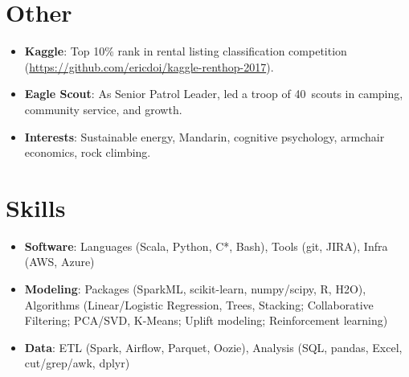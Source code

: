 \documentclass[letterpaper,11pt]{article}
\newcommand{\plus}{\raisebox{.4\height}{\scalebox{.6}{+}}}
\newcommand{\resumeItem}[2]{
  \item\small{
    \textbf{#1}{: #2 \vspace{-2pt}}
  }
}
\newcommand{\resumeSubItem}[2]{\resumeItem{#1}{#2}\vspace{-4pt}}
\newcommand{\resumeSubHeadingListStart}{\begin{itemize}[leftmargin=*]}
\newcommand{\resumeSubHeadingListEnd}{\end{itemize}}
\begin{document}
\section{Other}
  \resumeSubHeadingListStart
    \resumeSubItem{Kaggle}
      {Top 10\% rank in rental listing classification competition (\href{github.com/ericdoi/kaggle-renthop-2017}{https://github.com/ericdoi/kaggle-renthop-2017}).}
    \resumeSubItem{Eagle Scout}
      {As Senior Patrol Leader, led a troop of 40\plus~scouts in camping, community service, and growth.}
    \resumeSubItem{Interests}
      {Sustainable energy, Mandarin, cognitive psychology, armchair economics, rock climbing.}
  \resumeSubHeadingListEnd


\section{Skills}
  \resumeSubHeadingListStart
    \resumeItem{Software}{Languages (Scala, Python, C*, Bash), Tools (git, JIRA), Infra (AWS, Azure)}
    \resumeItem{Modeling}{Packages (SparkML, scikit-learn, numpy/scipy, R, H2O), Algorithms (Linear/Logistic Regression, Trees, Stacking; Collaborative Filtering; PCA/SVD, K-Means; Uplift modeling; Reinforcement learning)}
    \resumeItem{Data}{ETL (Spark, Airflow, Parquet, Oozie), Analysis (SQL, pandas, Excel, cut/grep/awk, dplyr)}
  \resumeSubHeadingListEnd


\end{document}
